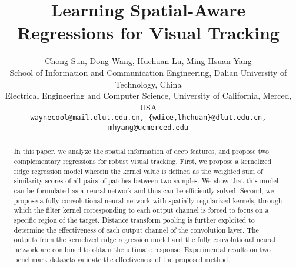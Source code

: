 \documentclass[10pt,twocolumn,letterpaper]{article}
\begin{document}
\title{Learning Spatial-Aware Regressions for Visual Tracking}

\author{Chong Sun, Dong Wang, Huchuan Lu, Ming-Hsuan Yang\\
School of Information and Communication Engineering, Dalian University of Technology, China\\ Electrical Engineering and Computer Science, University of California, Merced, USA\\
{\tt\small waynecool@mail.dlut.edu.cn, \{wdice,lhchuan\}@dlut.edu.cn,  mhyang@ucmerced.edu}
}

\maketitle
\thispagestyle{empty}

\begin{abstract}
 In this paper, we analyze the spatial information of deep features, and propose two complementary
 regressions for robust visual tracking.
First, we propose a kernelized ridge regression model wherein the kernel value is defined as the
 weighted sum of similarity scores of all pairs of patches between two samples.
We show that this model can be formulated as a neural network and thus can be efficiently solved.
Second, we propose a fully convolutional neural network with spatially regularized kernels, through
which the filter kernel corresponding to each output channel is forced to focus on a specific region of the target.
Distance transform pooling is further exploited to determine the effectiveness
of each output channel of the convolution layer.
The outputs from the kernelized ridge regression model and the fully convolutional neural network
are combined to obtain the ultimate response.
Experimental results on two benchmark datasets validate the effectiveness of the proposed method.

\end{abstract}
\end{document}
